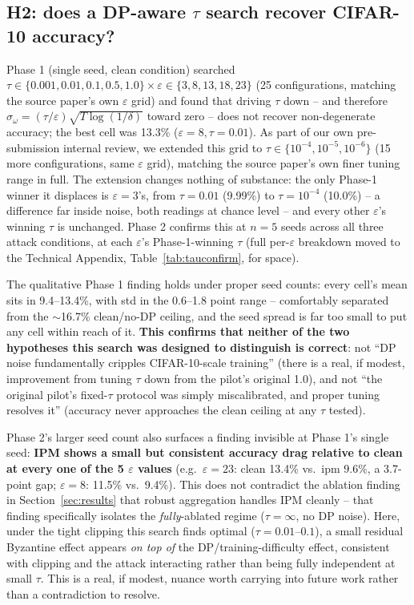 \documentclass{article}
\begin{document}
\subsection{H2: does a DP-aware $\tau$ search recover CIFAR-10 accuracy?}
Phase 1 (single seed, clean condition) searched $\tau\in\{0.001,0.01,0.1,0.5,
1.0\}\times\varepsilon\in\{3,8,13,18,23\}$ (25 configurations, matching the
source paper's own $\varepsilon$ grid) and found that driving $\tau$ down --
and therefore $\sigma_\omega=(\tau/\varepsilon)\sqrt{T\log(1/\delta)}$ toward
zero -- does not recover non-degenerate accuracy; the best cell was 13.3\%
($\varepsilon{=}8,\tau{=}0.01$). As part of our own pre-submission internal
review, we extended this grid to $\tau\in\{10^{-4},10^{-5},10^{-6}\}$ (15 more configurations,
same $\varepsilon$ grid), matching the source paper's own finer tuning range
in full. The extension changes nothing of substance: the only Phase-1 winner
it displaces is $\varepsilon{=}3$'s, from $\tau{=}0.01$ (9.99\%) to
$\tau{=}10^{-4}$ (10.0\%) -- a difference far inside noise, both readings at
chance level -- and every other $\varepsilon$'s winning $\tau$ is unchanged.
Phase 2 confirms this at $n{=}5$ seeds across
all three attack conditions, at each $\varepsilon$'s Phase-1-winning $\tau$
(full per-$\varepsilon$ breakdown moved to the Technical Appendix,
Table~\ref{tab:tauconfirm}, for space).

The qualitative Phase 1 finding holds under proper seed counts: every cell's
mean sits in 9.4--13.4\%, with std in the 0.6--1.8 point range -- comfortably
separated from the $\sim$16.7\% clean/no-DP ceiling, and the seed spread is
far too small to put any cell within reach of it. \textbf{This confirms that
neither of the two hypotheses this search was designed to distinguish is
correct}: not ``DP noise fundamentally cripples CIFAR-10-scale training''
(there is a real, if modest, improvement from tuning $\tau$ down from the
pilot's original 1.0), and not ``the original pilot's fixed-$\tau$ protocol
was simply miscalibrated, and proper tuning resolves it'' (accuracy never
approaches the clean ceiling at any $\tau$ tested).

Phase 2's larger seed count also surfaces a finding invisible at Phase 1's
single seed: \textbf{IPM shows a small but consistent accuracy drag relative
to clean at every one of the 5 $\varepsilon$ values} (e.g.\ $\varepsilon{=}23$:
clean 13.4\% vs.\ ipm 9.6\%, a 3.7-point gap; $\varepsilon{=}8$: 11.5\% vs.\
9.4\%). This does not contradict the ablation finding in
Section~\ref{sec:results} that robust aggregation handles IPM cleanly --
that finding specifically isolates the \emph{fully}-ablated regime
($\tau{=}\infty$, no DP noise). Here, under the tight clipping this search
finds optimal ($\tau{=}0.01$--$0.1$), a small residual Byzantine effect
appears \emph{on top of} the DP/training-difficulty effect, consistent with
clipping and the attack interacting rather than being fully independent at
small $\tau$. This is a real, if modest, nuance worth carrying into
future work rather than a contradiction to resolve.
\end{document}
